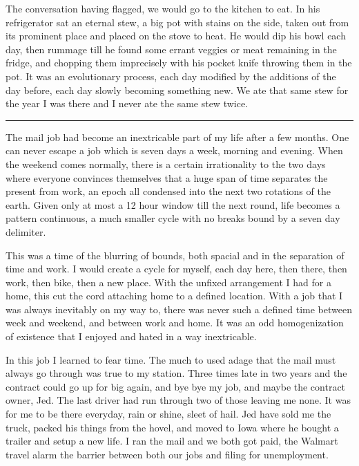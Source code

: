 \documentclass[ebook, 10pt, openright, onecolumn]{memoir}
\newcommand*\starbreak{\fancybreak*{\Large{* * *}}}
\begin{document}
The conversation having flagged, we would go to the kitchen to eat.  In his
refrigerator sat an eternal stew, a big pot with stains on the side, taken out
from its prominent place and placed on the stove to heat.  He would dip his bowl
each day, then rummage till he found some errant veggies or meat remaining in
the fridge, and chopping them imprecisely with his pocket knife throwing them in
the pot.  It was an evolutionary process, each day modified by the additions of
the day before, each day slowly becoming something new.  We ate that same stew
for the year I was there and I never ate the same stew twice.

\starbreak

The mail job had become an inextricable part of my life after a few months.  One
can never escape a job which is seven days a week, morning and evening.  When
the weekend comes normally, there is a certain irrationality to the two days
where everyone convinces themselves that a huge span of time separates the
present from work, an epoch all condensed into the next two rotations of the
earth.  Given only at most a 12 hour window till the next round, life becomes a
pattern continuous, a much smaller cycle with no breaks bound by a seven day
delimiter.

This was a time of the blurring of bounds, both spacial and in the separation of
time and work.  I would create a cycle for myself, each day here, then there,
then work, then bike, then a new place.  With the unfixed arrangement I had for
a home, this cut the cord attaching home to a defined location.  With a job that
I was always inevitably on my way to, there was never such a defined time
between week and weekend, and between work and home.  It was an odd
homogenization of existence that I enjoyed and hated in a way inextricable. 

In this job I learned to fear time.  The much to used adage that the mail must
always go through was true to my station. Three times late in two years and the
contract could go up for big again, and bye bye my job, and maybe the contract
owner, Jed.  The last driver had run through two of those leaving me none.  It
was for me to be there everyday, rain or shine, sleet of hail.  Jed have sold me
the truck, packed his things from the hovel, and moved to Iowa where he bought a
trailer and setup a new life.  I ran the mail and we both got paid, the Walmart
travel alarm the barrier between both our jobs and filing for unemployment.
\end{document}
